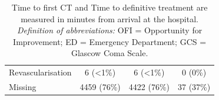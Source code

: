 \documentclass[12pt, a4paper]{article}
\begin{document}
\begin{appendices}
\begin{table}[t!]
{\begin{tabular}{lccc}
				\hspace{3mm}Revascularisation                 & 6 (\textless1\%)  & 6 (\textless1\%)  & 0 (0\%)       \\
				\hspace{3mm}Missing                           & 4459 (76\%)       & 4422 (76\%)       & 37 (37\%)     \\
				\bottomrule
			\end{tabular}
		}
		\caption*{\small Time to first CT and Time to definitive treatment are measured in minutes from arrival at the hospital.\\
			\textit{Definition of abbreviations:} OFI = Opportunity for Improvement; ED = Emergency Department; GCS = Glascow Coma Scale.}
	\end{table}
\end{appendices}
\end{document}
